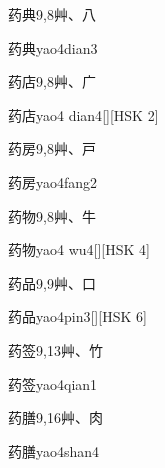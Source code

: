 \begin{Entry}{药典}{9,8}{⾋、⼋}
  \begin{Phonetics}{药典}{yao4dian3}
  \end{Phonetics}
\end{Entry}

\begin{Entry}{药店}{9,8}{⾋、⼴}
  \begin{Phonetics}{药店}{yao4 dian4}[][HSK 2]
  \end{Phonetics}
\end{Entry}

\begin{Entry}{药房}{9,8}{⾋、⼾}
  \begin{Phonetics}{药房}{yao4fang2}
  \end{Phonetics}
\end{Entry}

\begin{Entry}{药物}{9,8}{⾋、⽜}
  \begin{Phonetics}{药物}{yao4 wu4}[][HSK 4]
  \end{Phonetics}
\end{Entry}

\begin{Entry}{药品}{9,9}{⾋、⼝}
  \begin{Phonetics}{药品}{yao4pin3}[][HSK 6]
  \end{Phonetics}
\end{Entry}

\begin{Entry}{药签}{9,13}{⾋、⽵}
  \begin{Phonetics}{药签}{yao4qian1}
  \end{Phonetics}
\end{Entry}

\begin{Entry}{药膳}{9,16}{⾋、⾁}
  \begin{Phonetics}{药膳}{yao4shan4}
  \end{Phonetics}
\end{Entry}

